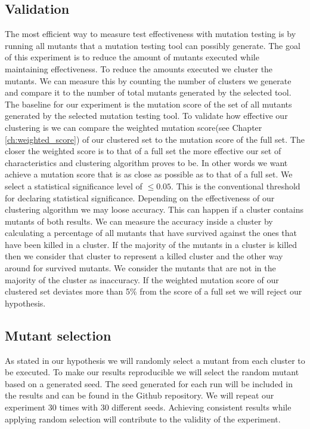 \documentclass[../../main]{subfiles}
\begin{document}
\subsection{Validation}
\label{ch:exp1_validation}
The most efficient way to measure test effectiveness with mutation testing is by running all mutants that a mutation testing tool can possibly generate.
The goal of this experiment is to reduce the amount of mutants executed while maintaining effectiveness.
To reduce the amounts executed we cluster the mutants. 
We can measure this by counting the number of clusters we generate and compare it to the number of total mutants generated by the selected tool.
\newline
The baseline for our experiment is the mutation score of the set of all mutants generated by the selected mutation testing tool.
\newline
To validate how effective our clustering is we can compare the weighted mutation score(see Chapter \ref{ch:weighted_score}) of our clustered set to the mutation score of the full set.
The closer the weighted score is to that of a full set the more effective our set of characteristics and clustering algorithm proves to be.
In other words we want achieve a mutation score that is as close as possible as to that of a full set.
We select a statistical significance level of $\leq 0.05$.
This is the conventional threshold for declaring statistical significance\cite{Kirk1996PracticalCome}.
\newline
Depending on the effectiveness of our clustering algorithm we may loose accuracy.
This can happen if a cluster contains mutants of both results. 
We can measure the accuracy inside a cluster by calculating a percentage of all mutants that have survived against the ones that have been killed in a cluster.
If the majority of the mutants in a cluster is killed then we consider that cluster to represent a killed cluster and the other way around for survived mutants.
We consider the mutants that are not in the majority of the cluster as inaccuracy.
\newline
If the weighted mutation score of our clustered set deviates more than 5\% from the score of a full set we will reject our hypothesis.

\subsection{Mutant selection}
As stated in our hypothesis we will randomly select a mutant from each cluster to be executed.
To make our results reproducible we will select the random mutant based on a generated seed.
The seed generated for each run will be included in the results and can be found in the Github repository\cite{rbasarat-repo}.
We will repeat our experiment 30 times with 30 different seeds.
Achieving consistent results while applying random selection will contribute to the validity of the experiment.
\end{document}
